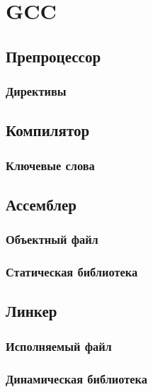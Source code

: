     \section{GCC}
    \subsection{Препроцессор}
    \subsubsection{Директивы}
    \subsection{Компилятор}
    \subsubsection{Ключевые слова}
    \subsection{Ассемблер}
    \subsubsection{Объектный файл}
    \subsubsection{Статическая библиотека}
    \subsection{Линкер}
    \subsubsection{Исполняемый файл}
    \subsubsection{Динамическая библиотека}




